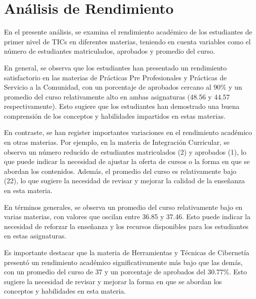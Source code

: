 \vspace{1cm}
\section{Análisis de Rendimiento}
En el presente análisis, se examina el rendimiento académico de los estudiantes de primer nivel de TICs en diferentes materias, teniendo en cuenta variables como el número de estudiantes matriculados, aprobados y promedio del curso.

En general, se observa que los estudiantes han presentado un rendimiento satisfactorio en las materias de Prácticas Pre Profesionales y Prácticas de Servicio a la Comunidad, con un porcentaje de aprobados cercano al 90\% y un promedio del curso relativamente alto en ambas asignaturas (48.56 y 44.57 respectivamente). Esto sugiere que los estudiantes han demostrado una buena comprensión de los conceptos y habilidades impartidos en estas materias.

En contraste, se han register importantes variaciones en el rendimiento académico en otras materias. Por ejemplo, en la materia de Integración Curricular, se observa un número reducido de estudiantes matriculados (2) y aprobados (1), lo que puede indicar la necesidad de ajustar la oferta de cursos o la forma en que se abordan los contenidos. Además, el promedio del curso es relativamente bajo (22), lo que sugiere la necesidad de revisar y mejorar la calidad de la enseñanza en esta materia.

En términos generales, se observa un promedio del curso relativamente bajo en varias materias, con valores que oscilan entre 36.85 y 37.46. Esto puede indicar la necesidad de reforzar la enseñanza y los recursos disponibles para los estudiantes en estas asignaturas.

Es importante destacar que la materia de Herramientas y Técnicas de Cibernetía presentó un rendimiento académico significativamente más bajo que las demás, con un promedio del curso de 37 y un porcentaje de aprobados del 30.77\%. Esto sugiere la necesidad de revisar y mejorar la forma en que se abordan los conceptos y habilidades en esta materia.

